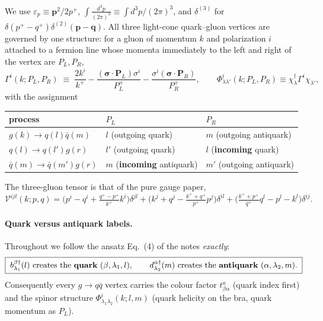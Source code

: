 \documentclass[11pt]{article}
\newcommand{\eps}{\varepsilon}
\newcommand{\dg}{\dagger}
\newcommand{\ip}[1]{\int\!\frac{d^{3}#1}{(2\pi)^{3}}}
\newcommand{\dthree}{\delta^{(3)}}
\newcommand{\Gam}{\Gamma}
\newcommand{\Ph}{\Phi}
\newcommand{\Vg}{\mathcal{V}}
\begin{document}
We use $\eps_p\equiv \bm p^2/2p^+$, $\ip{p}\equiv\int d^3p/(2\pi)^3$, and
$\dthree$ for $\delta(p^+-q^+)\delta^{(2)}(\bm p-\bm q)$. All three light-cone quark--gluon
vertices are governed by one structure: for a gluon of momentum $k$ and polarization $i$ attached
to a fermion line whose momenta immediately to the left and right of the vertex are $P_L,P_R$,
\begin{equation}
\Gam^{i}(k;P_L,P_R)\;\equiv\;\frac{2k^{i}}{k^{+}}
-\frac{(\bm\sigma\!\cdot\!\bm P_L)\sigma^{i}}{P_L^{+}}
-\frac{\sigma^{i}(\bm\sigma\!\cdot\!\bm P_R)}{P_R^{+}},
\qquad
\Ph^{i}_{\lambda\lambda'}(k;P_L,P_R)\equiv\chi^{\dg}_{\lambda}\Gam^{i}\chi_{\lambda'},
\label{eq:Gam}
\end{equation}
with the assignment
\begin{center}
\begin{tabular}{lll}
\hline
process & $P_L$ & $P_R$\\\hline
$g(k)\to q(l)\bar q(m)$ & $l$ (outgoing quark) & $m$ (outgoing antiquark)\\
$q(l)\to q(l')g(r)$ & $l'$ (outgoing quark) & $l$ (\textbf{incoming} quark)\\
$\bar q(m)\to\bar q(m')g(r)$ & $m$ (\textbf{incoming} antiquark) & $m'$ (outgoing antiquark)\\
\hline
\end{tabular}
\end{center}
The three-gluon tensor is that of the pure gauge paper,
\begin{equation}
\Vg^{ijl}(k;p,q)=\Big(p^{i}-q^{i}+\tfrac{q^{+}-p^{+}}{k^{+}}k^{i}\Big)\delta^{jl}
+\Big(k^{j}+q^{j}-\tfrac{k^{+}+q^{+}}{p^{+}}p^{j}\Big)\delta^{il}
+\Big(\tfrac{k^{+}+p^{+}}{q^{+}}q^{l}-p^{l}-k^{l}\Big)\delta^{ij}.
\end{equation}

\paragraph{Quark versus antiquark labels.} Throughout we follow the ansatz Eq.~(4) of the notes
\emph{exactly}:
\begin{equation}
\boxed{\;b^{\beta\dg}_{\lambda_1}(l)\ \text{creates the {\bf quark}}\ (\beta,\lambda_1,l),
\qquad
d^{\alpha\dg}_{\lambda_2}(m)\ \text{creates the {\bf antiquark}}\ (\alpha,\lambda_2,m).\;}
\label{eq:qlabels}
\end{equation}
Consequently every $g\to q\bar q$ vertex carries the colour factor $t^{a}_{\beta\alpha}$
(quark index first) and the spinor structure $\Ph^{i}_{\lambda_1\lambda_2}(k;l,m)$
(quark helicity on the bra, quark momentum as $P_L$).
\end{document}
